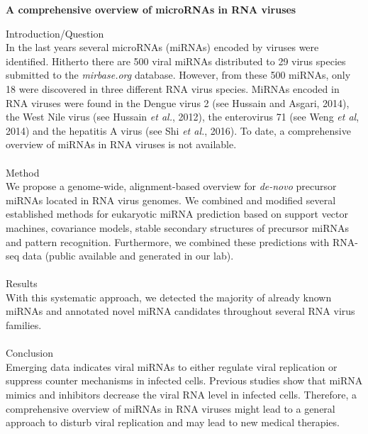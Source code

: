 \documentclass{article}
\begin{document}
\begin{center}
	\textbf{A comprehensive overview of microRNAs in RNA viruses}
\end{center}
\noindent
Introduction/Question\\
In the last years several microRNAs (miRNAs) encoded by viruses were identified.
Hitherto there are 500 viral miRNAs distributed to 29 virus species submitted to the \textit{mirbase.org} database.
However, from these 500 miRNAs, only 18 were discovered in three different RNA virus species.
MiRNAs encoded in RNA viruses were found in the Dengue virus 2 (see Hussain and Asgari, 2014), the West Nile virus (see Hussain \textit{et al.}, 2012), the enterovirus 71 (see Weng \textit{et al}, 2014)
and the hepatitis A virus (see Shi \textit{et al.}, 2016).
To date, a comprehensive overview of miRNAs in RNA viruses is not available.
\\ \ \\
Method\\
We propose a genome-wide, alignment-based overview for \textit{de-novo} precursor miRNAs located in RNA virus genomes.
We combined and modified several established methods for eukaryotic miRNA prediction based on support vector machines, covariance models, stable secondary structures of precursor miRNAs and pattern recognition.
Furthermore, we combined these predictions with RNA-seq data (public available and generated in our lab).
\\ \ \\
Results\\
With this systematic approach, we detected the majority of already known \mbox{miRNAs} and annotated novel miRNA candidates throughout several RNA virus families.
\\ \ \\
Conclusion\\
Emerging data indicates viral miRNAs to either regulate viral replication or suppress counter mechanisms in infected cells.
Previous studies show that miRNA mimics and inhibitors decrease the viral RNA level in infected cells.
Therefore, a comprehensive overview of miRNAs in RNA viruses might lead to a general approach to disturb viral replication and may lead to new  medical therapies.
\end{document}
